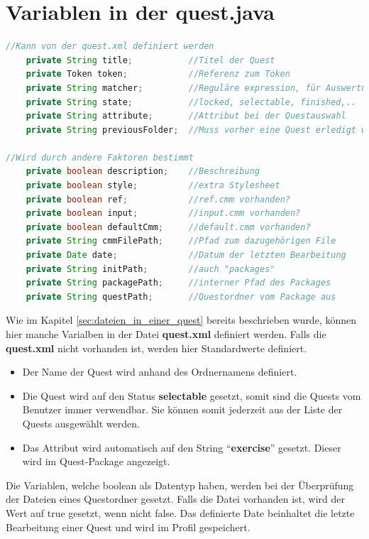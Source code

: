 \section{Variablen in der quest.java}
\begin{lstlisting}[language=JAVA]
//Kann von der quest.xml definiert werden
	private String title;			//Titel der Quest		
	private Token token;			//Referenz zum Token
	private String matcher;			//Reguläre expression, für Auswertung benötigt
	private String state;			//locked, selectable, finished,..
	private String attribute;		//Attribut bei der Questauswahl
	private String previousFolder;	//Muss vorher eine Quest erledigt werden

//Wird durch andere Faktoren bestimmt
	private boolean description;	//Beschreibung
	private boolean style;			//extra Stylesheet
	private boolean ref;			//ref.cmm vorhanden?
	private boolean input;			//input.cmm vorhanden?	
	private boolean defaultCmm;		//default.cmm vorhanden?
	private String cmmFilePath;		//Pfad zum dazugehörigen File	
	private Date date;				//Datum der letzten Bearbeitung
	private String initPath;		//auch "packages"
	private String packagePath;		//interner Pfad des Packages
	private String questPath;		//Questordner vom Package aus

\end{lstlisting}
Wie im Kapitel \ref{sec:dateien_in_einer_quest} bereits beschrieben wurde, können hier manche Varialben in der Datei \textbf{quest.xml} definiert werden. Falls die \textbf{quest.xml} nicht vorhanden ist, werden hier Standardwerte definiert.

\begin{itemize}
\item Der Name der Quest wird anhand des Ordnernamens definiert.
\item Die Quest wird auf den Status \textbf{selectable} gesetzt, somit sind die Quests vom Benutzer immer verwendbar. Sie können somit jederzeit aus der Liste der Quests ausgewählt werden.
\item Das Attribut wird automatisch auf den String "`\textbf{exercise}"' gesetzt. Dieser wird im Quest-Package angezeigt.
\end{itemize}

Die Variablen, welche boolean als Datentyp haben, werden bei der Überprüfung der Dateien eines Questordner gesetzt. Falls die Datei vorhanden ist, wird der Wert auf true gesetzt, wenn nicht false. Das definierte Date beinhaltet die letzte Bearbeitung einer Quest und wird im Profil gespeichert.

